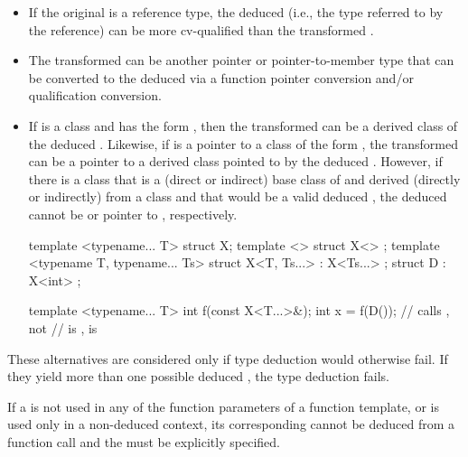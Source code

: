 \begin{itemize}
\item
If the original
is a reference type, the deduced
(i.e.,
the type referred to by the reference) can be more cv-qualified than
the transformed .
\item
The transformed 
can be another pointer or pointer-to-member type that can be converted
to the deduced
via a function pointer conversion and/or
qualification conversion.

\item
If
is a class and
has the form
,
then
the transformed 
can be a derived class  of the
deduced
.
Likewise, if
is a pointer to a class of the form
,
the transformed 
can be a pointer to a
derived class  pointed to by the deduced
.
However, if there is a class  that is
a (direct or indirect) base class of  and
derived (directly or indirectly) from a class  and
that would be a valid deduced ,
the deduced  cannot be  or pointer to ,
respectively.
\begin{example}
\begin{codeblock}
template <typename... T> struct X;
template <> struct X<> {};
template <typename T, typename... Ts>
  struct X<T, Ts...> : X<Ts...> {};
struct D : X<int> {};

template <typename... T>
int f(const X<T...>&);
int x = f(D());    // calls , not 
                   //  is ,  is 
\end{codeblock}
\end{example}
\end{itemize}

\pnum
These alternatives are considered only if type deduction would
otherwise fail.
If they yield more than one possible deduced
,
the type deduction fails.
\begin{note}
If a
is not used in any of the function parameters of a function template,
or is used only in a non-deduced context, its corresponding
cannot be deduced from a function call and the
must be explicitly specified.
\end{note}


